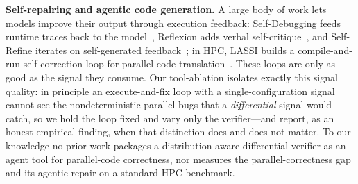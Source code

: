 \vspace{4pt}
\noindent\textbf{Self-repairing and agentic code generation.}
A large body of work lets models improve their output through execution feedback:
Self-Debugging feeds runtime traces back to the model~\cite{selfdebug}, Reflexion
adds verbal self-critique~\cite{reflexion}, and Self-Refine iterates on
self-generated feedback~\cite{selfrefine}; in HPC, LASSI builds a
compile-and-run self-correction loop for parallel-code
translation~\cite{lassi}. These loops are only as good as the signal they consume.
Our tool-ablation isolates exactly this signal quality: in principle an
execute-and-fix loop with a single-configuration signal cannot see the
nondeterministic parallel bugs that a \emph{differential} signal would catch, so we
hold the loop fixed and vary only the verifier---and report, as an honest empirical
finding, when that distinction does and does not matter. To our knowledge no prior
work packages a distribution-aware differential verifier as an agent tool for
parallel-code correctness, nor measures the parallel-correctness gap and its
agentic repair on a standard HPC benchmark.
